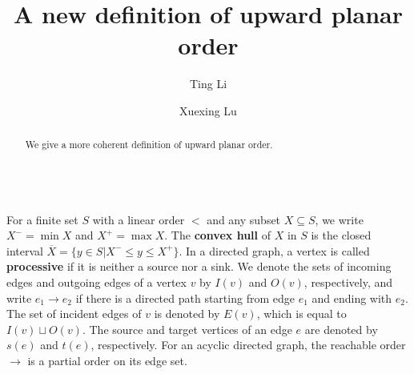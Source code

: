 \documentclass[11pt,a4paper]{article}
\begin{document}
\title{A new definition of upward planar order}

\author[a]{Ting Li}

\author[b]{Xuexing Lu}


\renewcommand\Authands{ and }
\maketitle

\begin{abstract}
We give a more coherent  definition of upward planar order.
\end{abstract}

\\

For a finite set $S$ with a linear order $<$ and any subset $X\subseteq S$, we write $X^-=\min{X}$ and $X^+=\max{X}$. The \textbf{convex hull} of $X$ in $S$ is the closed interval $\overline{X} = \{y\in S| X^-\leq y\leq X^+\}$.
In a directed graph, a vertex is called \textbf{processive} if it is neither a source nor a sink. We denote the sets of incoming edges and outgoing edges of a vertex $v$ by $I(v)$ and $O(v)$, respectively, and write $e_1\to e_2$ if there is a directed path starting from edge $e_1$ and ending with $e_2$. The set of incident edges of $v$ is denoted by $E(v)$, which is equal to $I(v)\sqcup O(v)$. The source and target vertices of an edge $e$ are denoted by $s(e)$ and $t(e)$, respectively. For an acyclic directed graph, the reachable order $\to$ is a partial order on its edge set.
\end{document}
